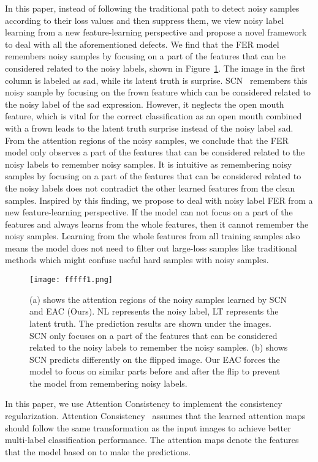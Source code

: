 \documentclass[runningheads]{llncs}
\begin{document}
In this paper, instead of following the traditional path to detect noisy samples according to their loss values and then suppress them, we view noisy label learning from a new feature-learning perspective and propose a novel framework to deal with all the aforementioned defects. We find that the FER model remembers noisy samples by focusing on a part of the features that can be considered related to the noisy labels, shown in Figure~\ref{fig:attention}. The image in the first column is labeled as sad, while its latent truth is surprise. SCN~\cite{wang2020suppressing} remembers this noisy sample by focusing on the frown feature which can be considered related to the noisy label of the sad expression. However, it neglects the open mouth feature, which is vital for the correct classification as an open mouth combined with a frown leads to the latent truth surprise instead of the noisy label sad. From the attention regions of the noisy samples, we conclude that the FER model only observes a part of the features that can be considered related to the noisy labels to remember noisy samples. It is intuitive as remembering noisy samples by focusing on a part of the features that can be considered related to the noisy labels does not contradict the other learned features from the clean samples. Inspired by this finding, we propose to deal with noisy label FER from a new feature-learning perspective. If the model can not focus on a part of the features and always learns from the whole features, then it cannot remember the noisy samples. Learning from the whole features from all training samples also means the model does not need to filter out large-loss samples like traditional methods which might confuse useful hard samples with noisy samples.

\begin{figure}[!t]
\centering
\texttt{[image: fffff1.png]}
\caption{(a) shows the attention regions of the noisy samples learned by SCN and EAC (Ours). NL represents the noisy label, LT represents the latent truth. The prediction results are shown under the images. SCN only focuses on a part of the features that can be considered related to the noisy labels to remember the noisy samples. (b) shows SCN predicts differently on the flipped image. Our EAC forces the model to focus on similar parts before and after the flip to prevent the model from remembering noisy labels.}
\label{fig:attention}
\end{figure}

In this paper, we use Attention Consistency to implement the consistency regularization. Attention Consistency~\cite{guo2019visual} assumes that the learned attention maps should follow the same transformation as the input images to achieve better multi-label classification performance. The attention maps denote the features that the model based on to make the predictions. 
\end{document}

